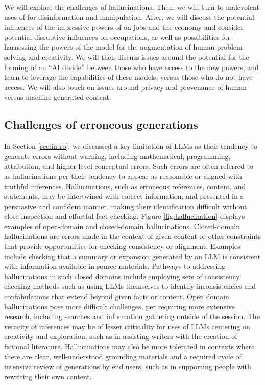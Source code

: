 We will explore the challenges of hallucinations. Then, we will turn to malevolent uses of {\DV} for disinformation and manipulation.  After, we will discuss the potential influences of the impressive powers of {\DV} on jobs and the economy and consider potential disruptive influences on occupations, as well as possibilities for harnessing the powers of the model for the augmentation of human problem solving and creativity.  We will then discuss issues around the potential for the forming of an ``AI divide'' between those who have access to the new powers, and learn to leverage the capabilities of these models, versus those who do not have access. We will also touch on issues around privacy and provenance of human versus machine-generated content.

\subsection{Challenges of erroneous generations} 

In Section \ref{sec:intro}, we discussed a key limitation of LLMs as their tendency to generate errors without warning, including mathematical, programming, attribution, and higher-level conceptual errors. Such errors are often referred to as hallucinations per their tendency to appear as reasonable or aligned with truthful inferences. Hallucinations, such as erroneous references, content, and statements, may be intertwined with correct information, and presented in a persuasive and confident manner, making their identification difficult without close inspection and effortful fact-checking.  Figure \ref{fig:hallucination} displays examples of open-domain and closed-domain hallucinations. Closed-domain hallucinations are errors made in the context of given content or other constraints that provide opportunities for checking consistency or alignment. Examples include checking that a summary or expansion generated by an LLM is consistent with information available in source materials. Pathways to addressing hallucinations in such closed domains include employing sets of consistency checking methods such as using LLMs themselves to identify inconsistencies and confabulations that extend beyond given facts or content. Open domain hallucinations pose more difficult challenges, per requiring more extensive research, including searches and information gathering outside of the session. The veracity of inferences may be of lesser criticality for uses of LLMs centering on creativity and exploration, such as in assisting writers with the creation of fictional literature. Hallucinations may also be more tolerated in contexts where there are clear, well-understood grounding materials and a required cycle of intensive review of generations by end users, such as in supporting people with rewriting their own content. 

